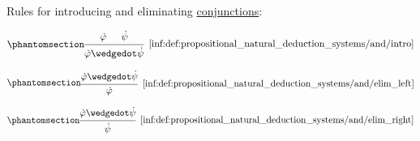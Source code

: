\begin{definition}
\begin{thmenum}
     Rules for introducing and eliminating \hyperref[def:propositional_alphabet/connectives/conjunction]{conjunctions}:
    \begin{paracol}{3}
      \begin{nthcolumn}{0}
        \begin{equation*}\taglabel[\ensuremath{ \wedge^+ }]{inf:def:propositional_natural_deduction_systems/and/intro}
          \begin{prooftree}
            \hypo{ \syn\varphi }
            \hypo{ \syn\psi }
            \infer2[\ref{inf:def:propositional_natural_deduction_systems/and/intro}]{ \syn\varphi \synwedge \syn\psi }
          \end{prooftree}
        \end{equation*}
      \end{nthcolumn}

      \begin{nthcolumn}{1}
        \begin{equation*}\taglabel[\ensuremath{ \wedge^{-L} }]{inf:def:propositional_natural_deduction_systems/and/elim_left}
          \begin{prooftree}
            \hypo{ \syn\varphi \synwedge \syn\psi }
            \infer1[\ref{inf:def:propositional_natural_deduction_systems/and/elim_left}]{ \syn\varphi }
          \end{prooftree}
        \end{equation*}
      \end{nthcolumn}

      \begin{nthcolumn}{2}
        \begin{equation*}\taglabel[\ensuremath{ \wedge^{-R} }]{inf:def:propositional_natural_deduction_systems/and/elim_right}
          \begin{prooftree}
            \hypo{ \syn\varphi \synwedge \syn\psi }
            \infer1[\ref{inf:def:propositional_natural_deduction_systems/and/elim_right}]{ \syn\psi }
          \end{prooftree}
        \end{equation*}
      \end{nthcolumn}
    \end{paracol}


\end{thmenum}
\end{definition}
